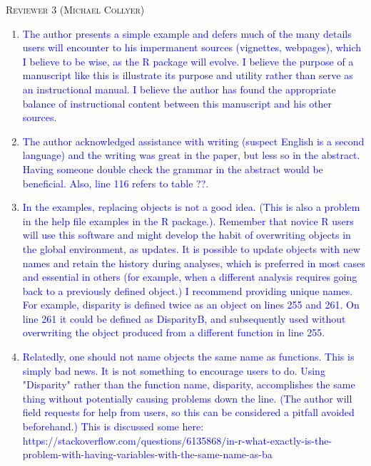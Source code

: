 \documentclass[12pt,letterpaper]{article}
\renewcommand{\section}[1]{%
\bigskip
\begin{center}
\begin{Large}
\normalfont\scshape #1
\medskip
\end{Large}
\end{center}}
\begin{document}
\section{Reviewer 3 (Michael Collyer)}

\begin{enumerate}

\item{\textcolor{blue}{The author presents a simple example and defers much of the many details users will encounter to his impermanent sources (vignettes, webpages), which I believe to be wise, as the R package will evolve.  I believe the purpose of a manuscript like this is illustrate its purpose and utility rather than serve as an instructional manual.  I believe the author has found the appropriate balance of instructional content between this manuscript and his other sources.}}


\item{\textcolor{blue}{The author acknowledged assistance with writing (suspect English is a second language) and the writing was great in the paper, but less so in the abstract.  Having someone double check the grammar in the abstract would be beneficial.  Also, line 116 refers to table ??.}}

\item{\textcolor{blue}{In the examples, replacing objects is not a good idea.  (This is also a problem in the help file examples in the R package.).  Remember that novice R users will use this software and might develop the habit of overwriting objects in the global environment, as updates.  It is possible to update objects with new names and retain the history during analyses, which is preferred in most cases and essential in others (for example, when a different analysis requires going back to a previously defined object.)  I recommend providing unique names.  For example, disparity is defined twice as an object on lines 255 and 261.  On line 261 it could be defined as DisparityB, and subsequently used without overwriting the object produced from a different function in line 255.}}


\item{\textcolor{blue}{Relatedly, one should not name objects the same name as functions.  This is simply bad news.  It is not something to encourage users to do.  Using "Disparity" rather than the function name, disparity, accomplishes the same thing without potentially causing problems down the line.  (The author will field requests for help from users, so this can be considered a pitfall avoided beforehand.)  This is discussed some here: https://stackoverflow.com/questions/6135868/in-r-what-exactly-is-the-problem-with-having-variables-with-the-same-name-as-ba}}


\end{enumerate}
\end{document}
